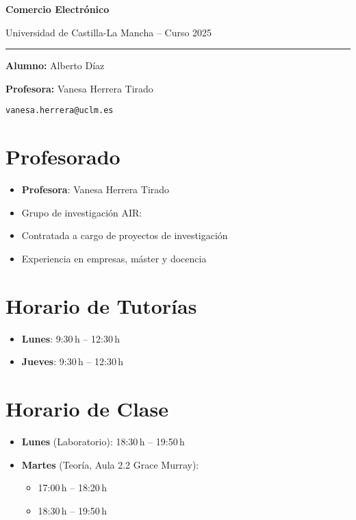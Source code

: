 \documentclass[11pt,a4paper]{article}
\begin{document}
	\begin{center}
		\centering
		\vspace*{2cm}
		{\huge \bfseries Comercio Electrónico \par}
		\vspace{0.7cm}
		{\Large Universidad de Castilla-La Mancha -- Curso 2025 \par}
		\vspace{0.5cm}
		\rule{0.8\linewidth}{0.8pt} \par
		\vspace{0.5cm}
		{\faUser\; \textbf{Alumno:} Alberto Díaz \par}
		\vspace{0.2cm}
		{\faChalkboardTeacher\; \textbf{Profesora:} Vanesa Herrera Tirado \par}
		\vspace{0.2cm}
		{\faEnvelope\; \texttt{vanesa.herrera@uclm.es} \par}
		\vfill
	\end{center}

	\section*{Profesorado}
	\begin{itemize}[leftmargin=1.5em]
		\item \textbf{Profesora}: Vanesa Herrera Tirado
		\item Grupo de investigación AIR:
		\item Contratada a cargo de proyectos de investigación
		\item Experiencia en empresas, máster y docencia
	\end{itemize}

	\section*{Horario de Tutorías}
	\begin{itemize}[leftmargin=1.5em]
		\item \textbf{Lunes}: 9:30\,h -- 12:30\,h
		\item \textbf{Jueves}: 9:30\,h -- 12:30\,h
	\end{itemize}

	\section*{Horario de Clase}
	\begin{itemize}[leftmargin=1.5em]
		\item \textbf{Lunes} (Laboratorio): 18:30\,h -- 19:50\,h
		\item \textbf{Martes} (Teoría, Aula 2.2 Grace Murray):
		\begin{itemize}
			\item 17:00\,h -- 18:20\,h
			\item 18:30\,h -- 19:50\,h
		\end{itemize}
	\end{itemize}
\end{document}
